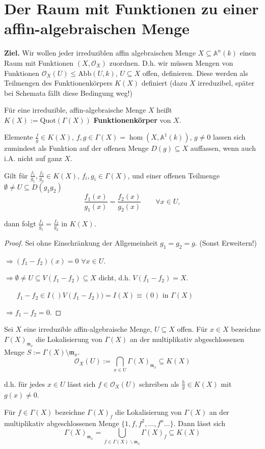 
\section{Der Raum mit Funktionen zu einer affin-algebraischen Menge}
\label{sec:alg-mengen-raeume-mit-fkt}

\textbf{Ziel.} Wir wollen jeder irreduziblen affin algebraischen Menge $X\subseteq\mathbb{A}^{n}(k)$ einen Raum mit Funktionen $(X,\mathcal{O}_{X})$ zuordnen.
D.h. wir müssen Mengen von Funktionen $\mathcal{O}_{X}(U) \leq \text{Abb}(U,k)$,
$U\subseteq X$ offen, definieren. Diese werden als Teilmengen des Funktionenkörpers
$K(X)$ definiert (dazu $X$ irreduzibel, später bei Schemata fällt
diese Bedingung weg!)
\begin{defn}
  \label{def:funktionenkoerper}
  Für eine irreduzible, affin-algebraische Menge $X$ heißt $K(X):=\text{Quot}(\Gamma(X))$ \textbf{Funktionenkörper} von $X$.

  Elemente $\frac{f}{g}\in K(X)$, $f,g\in\Gamma(X)=\hom(X,\mathbb{A}^{1}(k))$,
  $g\neq0$ lassen sich zumindest als Funktion auf der offenen Menge
  $D(g)\subseteq X$ auffassen, wenn auch i.A. nicht auf ganz
  $X$.
\end{defn}
\begin{lem}
  \label{lem:gleichheit-im-funktionenkoerper}
  Gilt für $\frac{f_{1}}{g_{1}},\frac{f_{2}}{g_{2}}\in K(X)$, $f_{i},g_{i}\in\Gamma(X)$,
  und einer offenen Teilmenge $\emptyset\neq U\subseteq D(g_{1}g_{2})$
  \[
    \frac{f_{1}(x)}{g_{1}(x)}=\frac{f_{2}(x)}{g_{2}(x)}\qquad\forall x\in U,
  \]

  dann folgt $\frac{f_{1}}{g_{1}}=\frac{f_{2}}{g_{2}}$ in $K(X)$.
\end{lem}
\begin{proof}
  Sei ohne Einschränkung der Allgemeinheit $g_{1}=g_{2}=g$. (Sonst
  Erweitern!) 

  $\Rightarrow(f_{1}-f_{2})(x)=0$ $\forall x\in U$.

  $\Rightarrow\emptyset\neq U\subseteq V(f_{1}-f_{2})\subseteq X$ dicht,
  d.h. $V(f_{1}-f_{2})=X$.

  $\phantom{\Rightarrow\ }$$f_{1}-f_{2}\in I()V(f_{1}-f_{2}))=I(X)\equiv(0)$
  in $\Gamma(X)$ 

  $\Rightarrow f_{1}-f_{2}=0$.
\end{proof}
\begin{defn}
  \label{def:alg-menge-als-raum-mit-fkt}
  Sei $X$ eine irreduzible affin-algebraische Menge, $U\subseteq X$
  offen. Für $x \in X$ bezeichne $\Gamma(X)_{\mathfrak{m}_{x}}$ die Lokalisierung von $\Gamma(X)$ an der multiplikativ abgeschlossenen Menge $S := \Gamma(X) \setminus \mathfrak{m}_{x}$.
  \[
    \mathcal{O}_{X}(U):=\bigcap_{x\in U}\Gamma(X)_{\mathfrak{m}_{x}}\subseteq K(X)
  \]

  d.h. für jedes $x\in U$ lässt sich $f\in\mathcal{O}_{X}(U)$ schreiben
  als $\frac{h}{g} \in K(X)$ mit $g(x)\neq0$.
\end{defn}
Für $f\in\Gamma(X)$ bezeichne $\Gamma(X)_{f}$ die Lokalisierung
von $\Gamma(X)$ an der multiplikativ abgeschlossenen Menge
$\{1,f,f^{2},\ldots,f^{n}\ldots\}$. Dann lässt sich
\[
  \Gamma(X)_{\mathfrak{m}_{x}}=\bigcup_{f\in\Gamma(X)\backslash\mathfrak{m}_{x}}\Gamma(X)_{f}\subseteq K(X)
\]


